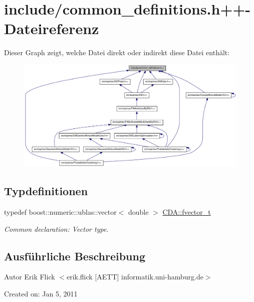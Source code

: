 \hypertarget{common__definitions_8h_09_09}{
\section{include/common\_\-definitions.h++-\/Dateireferenz}
\label{common__definitions_8h_09_09}
}
Dieser Graph zeigt, welche Datei direkt oder indirekt diese Datei enthält:\nopagebreak
\begin{figure}[H]
\begin{center}
\leavevmode
\includegraphics[width=420pt]{common__definitions_8h_09_09__dep__incl}
\end{center}
\end{figure}
\subsection*{Typdefinitionen}
\begin{DoxyCompactItemize}
\item 
\hypertarget{namespaceCDA_a2865ad6f0d6b1bb5edbff96a6f0f23f5}{
typedef boost::numeric::ublas::vector$<$ double $>$ \hyperlink{namespaceCDA_a2865ad6f0d6b1bb5edbff96a6f0f23f5}{CDA::fvector\_\-t}}
\label{namespaceCDA_a2865ad6f0d6b1bb5edbff96a6f0f23f5}

\begin{DoxyCompactList}\small\item\em Common declaration: Vector type. \item\end{DoxyCompactList}\end{DoxyCompactItemize}


\subsection{Ausführliche Beschreibung}
\begin{DoxyAuthor}{Autor}
Erik Flick $<$erik.flick \mbox{[}AETT\mbox{]} informatik.uni-\/hamburg.de$>$
\end{DoxyAuthor}
Created on: Jan 5, 2011 
